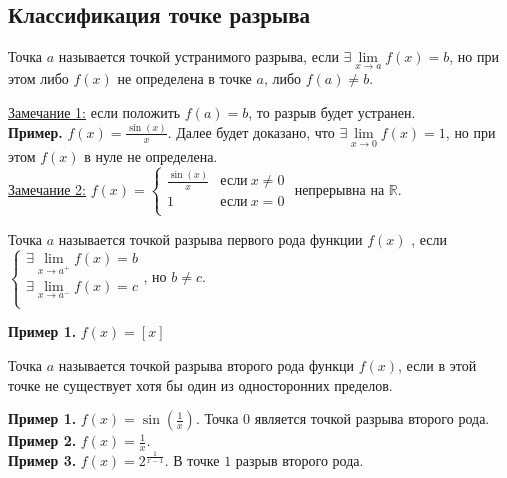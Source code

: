 \documentclass{article}
\begin{document}
\subsection{Классификация точке разрыва}
\begin{definition}
    Точка \(a\) называется точкой устранимого разрыва, если \(\exists \lim\limits_{x \to a}f(x) = b\), но при этом либо \(f(x)\) не определена в точке \(a\), либо \(f(a) \neq b\).     
\end{definition}
\noindent
\underline{Замечание 1:} если положить \(f(a) = b\), то разрыв будет устранен.\\
\textbf{Пример.} \(\displaystyle f(x) = \frac{\sin(x)}{x}\). Далее будет доказано, что \(\exists \lim\limits_{x \to 0}f(x) = 1\), но при этом \(f(x)\) в нуле не определена.\\
\underline{Замечание 2:} \(\displaystyle f(x) = 
\begin{cases}
    \displaystyle \frac{\sin(x)}{x} & \text{если}\ x \neq 0\\
    1 & \text{если}\ x = 0\\ 
\end{cases}
\) непрерывна на \(\mathbb{R}\). 

\begin{definition}
    Точка \(a\) называется точкой разрыва первого рода функции \(f(x)\) , если \(
    \begin{cases}
        \exists \lim\limits_{x \to a^+}f(x) = b\\
        \exists \lim\limits_{x \to a^-}f(x) = c\\
    \end{cases}\), но \(b \neq c\). 
\end{definition}
\noindent
\textbf{Пример 1.} \(f(x) = \left[x\right]\) 

\begin{definition}
    Точка \(a\) называется точкой разрыва второго рода функци \(f(x)\), если в этой точке не существует хотя бы один из односторонних пределов.  
\end{definition}
\noindent
\textbf{Пример 1.} \(\displaystyle f(x) = \sin\left(\frac{1}{x}\right)\). Точка \(0\) является точкой разрыва второго рода.\\
\textbf{Пример 2.} \(\displaystyle f(x) = \frac{1}{x}\).\\
\textbf{Пример 3.} \(\displaystyle f(x) = 2^{\displaystyle \frac{1}{x - 1}}\). В точке \(1\) разрыв второго рода.
\end{document}
